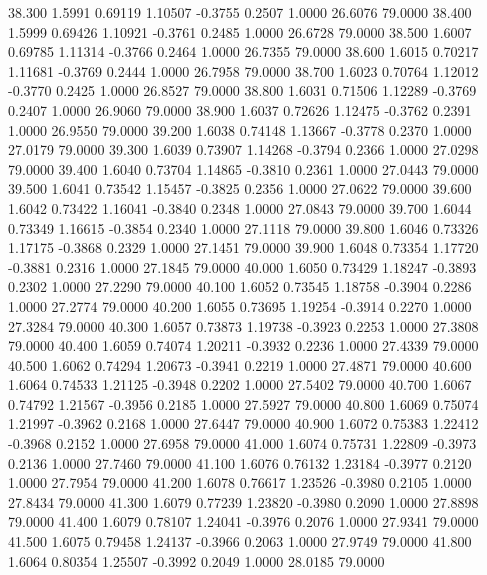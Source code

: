   38.300   1.5991   0.69119   1.10507  -0.3755   0.2507   1.0000  26.6076  79.0000
  38.400   1.5999   0.69426   1.10921  -0.3761   0.2485   1.0000  26.6728  79.0000
  38.500   1.6007   0.69785   1.11314  -0.3766   0.2464   1.0000  26.7355  79.0000
  38.600   1.6015   0.70217   1.11681  -0.3769   0.2444   1.0000  26.7958  79.0000
  38.700   1.6023   0.70764   1.12012  -0.3770   0.2425   1.0000  26.8527  79.0000
  38.800   1.6031   0.71506   1.12289  -0.3769   0.2407   1.0000  26.9060  79.0000
  38.900   1.6037   0.72626   1.12475  -0.3762   0.2391   1.0000  26.9550  79.0000
  39.200   1.6038   0.74148   1.13667  -0.3778   0.2370   1.0000  27.0179  79.0000
  39.300   1.6039   0.73907   1.14268  -0.3794   0.2366   1.0000  27.0298  79.0000
  39.400   1.6040   0.73704   1.14865  -0.3810   0.2361   1.0000  27.0443  79.0000
  39.500   1.6041   0.73542   1.15457  -0.3825   0.2356   1.0000  27.0622  79.0000
  39.600   1.6042   0.73422   1.16041  -0.3840   0.2348   1.0000  27.0843  79.0000
  39.700   1.6044   0.73349   1.16615  -0.3854   0.2340   1.0000  27.1118  79.0000
  39.800   1.6046   0.73326   1.17175  -0.3868   0.2329   1.0000  27.1451  79.0000
  39.900   1.6048   0.73354   1.17720  -0.3881   0.2316   1.0000  27.1845  79.0000
  40.000   1.6050   0.73429   1.18247  -0.3893   0.2302   1.0000  27.2290  79.0000
  40.100   1.6052   0.73545   1.18758  -0.3904   0.2286   1.0000  27.2774  79.0000
  40.200   1.6055   0.73695   1.19254  -0.3914   0.2270   1.0000  27.3284  79.0000
  40.300   1.6057   0.73873   1.19738  -0.3923   0.2253   1.0000  27.3808  79.0000
  40.400   1.6059   0.74074   1.20211  -0.3932   0.2236   1.0000  27.4339  79.0000
  40.500   1.6062   0.74294   1.20673  -0.3941   0.2219   1.0000  27.4871  79.0000
  40.600   1.6064   0.74533   1.21125  -0.3948   0.2202   1.0000  27.5402  79.0000
  40.700   1.6067   0.74792   1.21567  -0.3956   0.2185   1.0000  27.5927  79.0000
  40.800   1.6069   0.75074   1.21997  -0.3962   0.2168   1.0000  27.6447  79.0000
  40.900   1.6072   0.75383   1.22412  -0.3968   0.2152   1.0000  27.6958  79.0000
  41.000   1.6074   0.75731   1.22809  -0.3973   0.2136   1.0000  27.7460  79.0000
  41.100   1.6076   0.76132   1.23184  -0.3977   0.2120   1.0000  27.7954  79.0000
  41.200   1.6078   0.76617   1.23526  -0.3980   0.2105   1.0000  27.8434  79.0000
  41.300   1.6079   0.77239   1.23820  -0.3980   0.2090   1.0000  27.8898  79.0000
  41.400   1.6079   0.78107   1.24041  -0.3976   0.2076   1.0000  27.9341  79.0000
  41.500   1.6075   0.79458   1.24137  -0.3966   0.2063   1.0000  27.9749  79.0000
  41.800   1.6064   0.80354   1.25507  -0.3992   0.2049   1.0000  28.0185  79.0000

